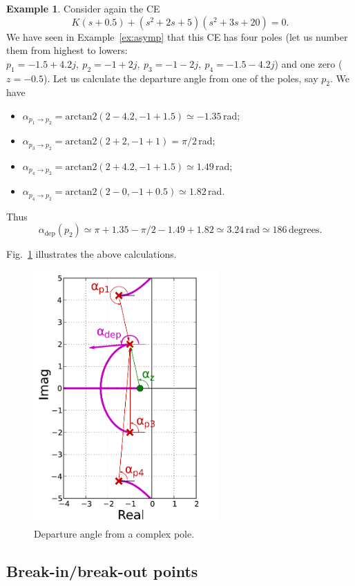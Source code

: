 \documentclass[a4paper,11pt]{report}
\theoremstyle{definition}
\newtheorem{mdexample}{Example}
\newenvironment{example}%
  {\vspace{0.1cm}\begin{mdframed}[backgroundcolor=lightgray]\begin{mdexample}}%
  {\end{mdexample}\end{mdframed}\vspace{0.1cm}}
\begin{document}
\begin{example}
  Consider again the CE
  \[
  K(s+0.5) + (s^2+2s+5)(s^2+3s+20) = 0.
  \]
  We have seen in Example~\ref{ex:asymp} that this CE has four poles
  (let us number them from highest to lowers: $p_1=-1.5+4.2j,\ p_2=-1+
  2j,\ p_3=-1-2j,\ p_4=-1.5-4.2j$) and one zero ($z=-0.5$). Let us
  calculate the departure angle from one of the poles, say $p_2$. We
  have
  \begin{itemize}
  \item $\alpha_{p_1\to
      p_2}=\mathrm{arctan2}(2-4.2,-1+1.5)\simeq-1.35$\,rad;
      \item $\alpha_{p_3\to
      p_2}=\mathrm{arctan2}(2+2,-1+1)=\pi/2$\,rad;
  \item $\alpha_{p_4\to
      p_2}=\mathrm{arctan2}(2+4.2,-1+1.5)\simeq1.49$\,rad;
  \item $\alpha_{p_4\to
      p_2}=\mathrm{arctan2}(2-0,-1+0.5)\simeq1.82$\,rad.
  \end{itemize}
  Thus   
  \[
  \alpha_\textrm{dep}(p_2) \simeq \pi+1.35-\pi/2-1.49+1.82 \simeq
  3.24\,\mathrm{rad} \simeq 186\,\mathrm{degrees}.
  \]

  Fig.~\ref{fig:zoomedin} illustrates the above calculations.

  \begin{figure}[H]
    \centering
    \includegraphics[width=7cm]{fig/zoomedin.pdf}
    \caption{Departure angle from a complex pole.}
    \label{fig:zoomedin}
  \end{figure}

\end{example}


\subsection{Break-in/break-out points}
\end{document}
